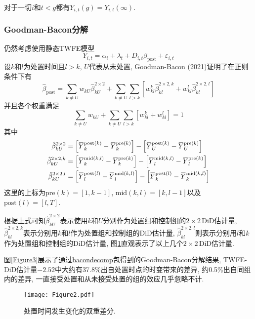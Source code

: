 \documentclass[cn,blue,14pt,screen,bibstyle=gb7714-2015]{elegantnote}
\newcommand{\overbar}[1]{\mkern 1.5mu\overline{\mkern-1.5mu#1\mkern-1.5mu}\mkern 1.5mu}
\begin{document}
\begin{definition}[无参与效应]
对于一切$i$和$t<g$都有$Y_{i,t}(g)=Y_{i,t}(\infty)$.
\end{definition}

\subsubsection{Goodman-Bacon分解}
仍然考虑使用静态TWFE模型
$$Y_{i,t}=\alpha_i+\lambda_t+D_{i,t}\beta_\text{post}+\varepsilon_{i,t}$$
设$k$和$l$为处置时间且$l>k$, $U$代表从未处置, Goodman-Bacon (2021)证明了在正则条件下有
$$\hat{\beta}_\text{post}=\sum_{k\ne U}w_{kU}\hat{\beta}_{kU}^{2\times 2}+\sum_{k\ne U}\sum_{l>k}\left[w_{kl}^k\hat{\beta}_{kl}^{2\times 2, k}+w_{kl}^l\hat{\beta}_{kl}^{2\times2,l}\right]$$
并且各个权重满足
$$\sum_{k\ne U}w_{kU}+\sum_{k\ne U}\sum_{l>k}\left[w_{kl}^k+w_{kl}^l\right]=1$$
其中
\begin{align*}
\hat{\beta}_{kU}^{2\times2}&=\left[\overbar{Y}_k^{\text{post}(k)}-\overbar{Y}_k^{\text{pre}(k)}\right]-\left[\overbar{Y}_U^{\text{post}(k)}-\overbar{Y}_U^{\text{pre}(k)}\right] \\
\hat{\beta}_{kU}^{2\times2, k}&=\left[\overbar{Y}_k^{\text{mid}(k,l)}-\overbar{Y}_k^{\text{pre}(k)}\right]-\left[\overbar{Y}_l^{\text{mid}(k,l)}-\overbar{Y}_l^{\text{pre}(k)}\right] \\
\hat{\beta}_{kU}^{2\times2, l}&=\left[\overbar{Y}_l^{\text{post}(l)}-\overbar{Y}_l^{\text{mid}(k,l)}\right]-\left[\overbar{Y}_k^{\text{post}(l)}-\overbar{Y}_k^{\text{mid}(k,l)}\right]
\end{align*}
这里的上标为$\text{pre}(k)=[1,k-1]$, $\text{mid}(k,l)=[k,l-1]$以及$\text{post}(l)=[l,T]$.

根据上式可知$\hat{\beta}^{2\times2}_{kU}$表示使用$k$和$U$分别作为处置组和控制组的$2\times2\,$DiD估计量, $\hat{\beta}_{kl}^{2\times2,k}$表示分别用$k$和$l$作为处置组和控制组的DiD估计量, $\hat{\beta}_{kl}^{2\times2, l}$则表示分别用$l$和$k$作为处置组和控制组的DiD估计量, 图\ref{Figure2}直观表示了以上几个$2\times 2\,$DiD估计量.

图\ref{Figure3}展示了通过\href{https://asjadnaqvi.github.io/DiD/docs/code/06_bacon/}{bacondecomp}包得到的Goodman-Bacon分解结果, TWFE-DiD估计量$-2.52$中大约有37.8\%出自处置时点的时变带来的差异, 约0.5\%出自同组内的差异, 一直接受处置和从未接受处置的组的效应几乎忽略不计.

\begin{figure}
  \centering
  \texttt{[image: Figure2.pdf]}
  \caption{处置时间发生变化的双重差分.}\label{Figure2}
\end{figure}
\end{document}
